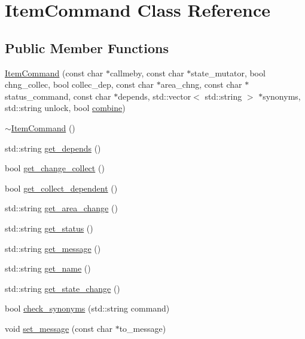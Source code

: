 \hypertarget{class_item_command}{
\section{\-Item\-Command \-Class \-Reference}
\label{class_item_command}
}
\subsection*{\-Public \-Member \-Functions}
\begin{DoxyCompactItemize}
\item 
\hyperlink{class_item_command_adb0c6cc33fce1d745c9da4b6d1796367}{\-Item\-Command} (const char $\ast$callmeby, const char $\ast$state\-\_\-mutator, bool chng\-\_\-collec, bool collec\-\_\-dep, const char $\ast$area\-\_\-chng, const char $\ast$status\-\_\-command, const char $\ast$depends, std\-::vector$<$ std\-::string $>$ $\ast$synonyms, std\-::string unlock, bool \hyperlink{classcombine}{combine})
\item 
\hyperlink{class_item_command_a3a7504fb83dbb0b1d708d80aa2c6cc47}{$\sim$\-Item\-Command} ()
\item 
std\-::string \hyperlink{class_item_command_aab2f239abd8e51eed941a7144c5a20f0}{get\-\_\-depends} ()
\item 
bool \hyperlink{class_item_command_a076738abba7d76c8b5e28f42e11b6df5}{get\-\_\-change\-\_\-collect} ()
\item 
bool \hyperlink{class_item_command_a478d2e1a02ea0b44e41e3d15e59e2156}{get\-\_\-collect\-\_\-dependent} ()
\item 
std\-::string \hyperlink{class_item_command_ac40efb86e5eab9229d2c343b308b6fa5}{get\-\_\-area\-\_\-change} ()
\item 
std\-::string \hyperlink{class_item_command_ad0a8c59554e3d4a7a14299fd7df8dc70}{get\-\_\-status} ()
\item 
std\-::string \hyperlink{class_item_command_a81079b514b0785ce9c86f8618f096c18}{get\-\_\-message} ()
\item 
std\-::string \hyperlink{class_item_command_ad19f0634b23480fcae2f05ee1a0f13f1}{get\-\_\-name} ()
\item 
std\-::string \hyperlink{class_item_command_aad1e85e694f5cd16cc11ad5acda2884e}{get\-\_\-state\-\_\-change} ()
\item 
bool \hyperlink{class_item_command_a7e2827365e9a8521fded9334cb53fb7f}{check\-\_\-synonyms} (std\-::string command)
\item 
void \hyperlink{class_item_command_abe177c8696e00480a716959b335ebca8}{set\-\_\-message} (const char $\ast$to\-\_\-message)

\end{DoxyCompactItemize}
